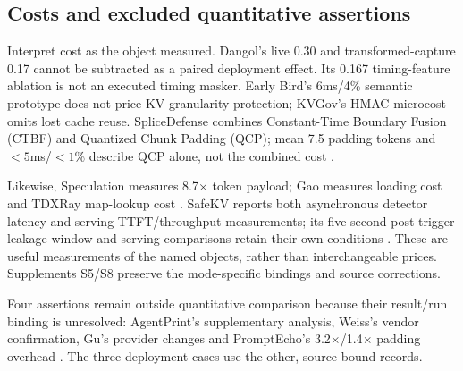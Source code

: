 \subsection{Costs and excluded quantitative assertions}
Interpret cost as the object measured. Dangol's live 0.30 and transformed-capture 0.17 cannot be subtracted as a paired deployment effect. Its 0.167 timing-feature ablation is not an executed timing masker. Early Bird's 6ms/4\% semantic prototype does not price KV-granularity protection; KVGov's HMAC microcost omits lost cache reuse. SpliceDefense combines Constant-Time Boundary Fusion (CTBF) and Quantized Chunk Padding (QCP); mean 7.5 padding tokens and $<5$ms/$<1$\% describe QCP alone, not the combined cost \cite{dangol2026workflow,earlybird2025,addagada2026kvgov,spliceleak2026}.

Likewise, Speculation measures 8.7$\times$ token payload; Gao measures loading cost and TDXRay map-lookup cost \cite{wei2024speculation,gao2025iknow,hornetz2026tdxray}. SafeKV reports both asynchronous detector latency and serving TTFT/throughput measurements; its five-second post-trigger leakage window and serving comparisons retain their own conditions \cite{chu2025safekv}. These are useful measurements of the named objects, rather than interchangeable prices. Supplements S5/S8 preserve the mode-specific bindings and source corrections.

Four assertions remain outside quantitative comparison because their result/run binding is unresolved: AgentPrint's supplementary analysis, Weiss's vendor confirmation, Gu's provider changes and PromptEcho's 3.2$\times$/1.4$\times$ padding overhead \cite{agentprint2025,weiss2024prompt,gu2025promptcaching,prompt_echo2026}. The three deployment cases use the other, source-bound records.
